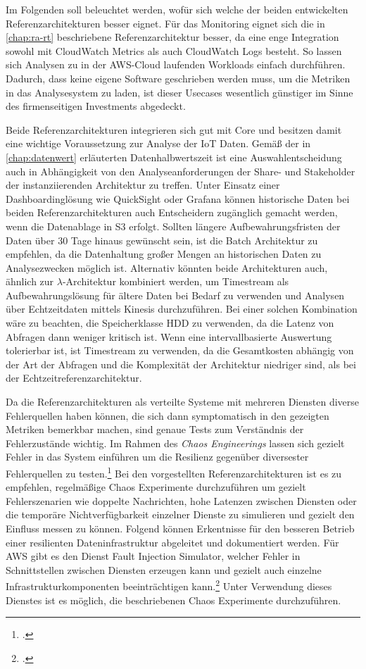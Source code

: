 Im Folgenden soll beleuchtet werden, wofür sich welche der beiden entwickelten Referenzarchitekturen besser eignet.
Für das Monitoring eignet sich die in \autoref{chap:ra-rt} beschriebene Referenzarchitektur besser, da eine enge Integration sowohl mit CloudWatch Metrics als auch CloudWatch Logs besteht. So lassen sich Analysen zu in der \ac{AWS}-Cloud laufenden Workloads einfach durchführen. Dadurch, dass keine eigene Software geschrieben werden muss, um die Metriken in das Analysesystem zu laden, ist dieser Usecases wesentlich günstiger im Sinne des firmenseitigen Investments abgedeckt.

Beide Referenzarchitekturen integrieren sich gut mit \AWSIOT{} Core und besitzen damit eine wichtige Voraussetzung zur Analyse der \ac{IoT} Daten. Gemäß der in \autoref{chap:datenwert} erläuterten Datenhalbwertszeit ist eine Auswahlentscheidung auch in Abhängigkeit von den Analyseanforderungen der Share- und Stakeholder der instanziierenden Architektur zu treffen. Unter Einsatz einer Dashboardinglösung wie QuickSight oder Grafana können historische Daten bei beiden Referenzarchitekturen auch Entscheidern zugänglich gemacht werden, wenn die Datenablage in \ac{S3} erfolgt. Sollten längere Aufbewahrungsfristen der Daten über 30 Tage hinaus gewünscht sein, ist die Batch Architektur zu empfehlen, da die Datenhaltung großer Mengen an historischen Daten zu Analysezwecken möglich ist. Alternativ könnten beide Architekturen auch, ähnlich zur $\lambda$-Architektur kombiniert werden, um Timestream als Aufbewahrungslösung für ältere Daten bei Bedarf zu verwenden und Analysen über Echtzeitdaten mittels Kinesis durchzuführen. Bei einer solchen Kombination wäre zu beachten, die Speicherklasse \ac{HDD} zu verwenden, da die Latenz von Abfragen dann weniger kritisch ist. Wenn eine intervallbasierte Auswertung tolerierbar ist, ist Timestream zu verwenden, da die Gesamtkosten abhängig von der Art der Abfragen und die Komplexität der Architektur niedriger sind, als bei der Echtzeitreferenzarchitektur.


Da die Referenzarchitekturen als verteilte Systeme mit mehreren Diensten diverse Fehlerquellen haben können, die sich dann symptomatisch in den gezeigten Metriken bemerkbar machen, sind genaue Tests zum Verständnis der Fehlerzustände wichtig. Im Rahmen des \textit{Chaos Engineerings} lassen sich gezielt Fehler in das System einführen um die Resilienz gegenüber diversester Fehlerquellen zu testen.\footcite[Vgl.][]{Augsten.2020} Bei den vorgestellten Referenzarchitekturen ist es zu empfehlen, regelmäßige Chaos Experimente durchzuführen um gezielt Fehlerszenarien wie doppelte Nachrichten, hohe Latenzen zwischen Diensten oder die temporäre Nichtverfügbarkeit einzelner Dienste zu simulieren und gezielt den Einfluss messen zu können. Folgend können Erkentnisse für den besseren Betrieb einer resilienten Dateninfrastruktur abgeleitet und dokumentiert werden. Für \ac{AWS} gibt es den Dienst Fault Injection Simulator, welcher Fehler in Schnittstellen zwischen Diensten erzeugen kann und gezielt auch einzelne Infrastrukturkomponenten beeinträchtigen kann.\footcite[Vgl.][]{Barr.2021b} Unter Verwendung dieses Dienstes ist es möglich, die beschriebenen Chaos Experimente durchzuführen.


